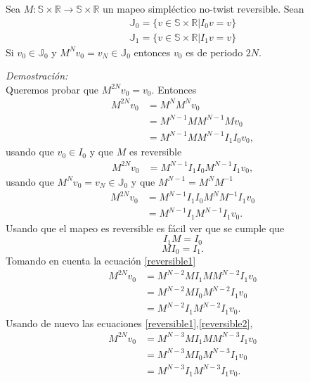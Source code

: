 \begin{thm}
Sea $M:\mathbb{S} \times \mathbb{R} \longrightarrow \mathbb{S}\times\mathbb{R}$ un mapeo simpl\'ectico no-twist reversible. Sean 
\begin{eqnarray}
\mathbb{J}_{0} = \{v \in \mathbb{S} \times \mathbb{R} | I_{0}v = v\}
\end{eqnarray}
\begin{eqnarray}
\mathbb{J}_{1} = \{v \in \mathbb{S} \times \mathbb{R} | I_{1}v = v\}
\end{eqnarray}
Si $v_{0}\in \mathbb{J}_{0}$ y $M^{N}v_{0}=v_{N}\in \mathbb{J}_{0}$ entonces $v_{0}$ es de periodo $2N$.
\end{thm}
\textit{Demostraci\'on:}\\
Queremos probar que $M^{2N}v_{0}=v_{0}$. Entonces
\begin{align*}
	M^{2N}v_{0} &= M^{N}M^{N}v_{0}\\
				&= M^{N-1}MM^{N-1}Mv_{0}\\
				&= M^{N-1}MM^{N-1}I_{1}I_{0}v_{0},
\end{align*}
usando que $v_{0}\in I_{0}$ y que $M$ es reversible
\begin{align*}
	M^{2N}v_{0} &= M^{N-1}I_{1}I_{0}M^{N-1}I_{1}v_{0},
\end{align*}
usando que $M^{N}v_{0}=v_{N}\in \mathbb{J}_{0}$ y que $M^{N-1}=M^{N}M^{-1}$
\begin{align*}
	M^{2N}v_{0} &= M^{N-1}I_{1}I_{0}M^{N}M^{-1}I_{1}v_{0}\\
				&= M^{N-1}I_{1}	M^{N-1}I_{1}v_{0}.
\end{align*}
Usando que el mapeo es reversible es f\'acil ver que se cumple que
\begin{equation}
I_{1}M=I_{0}
\label{reversible1}
\end{equation}
\begin{equation}
MI_{0} = I_{1}.
\label{reversible2}
\end{equation}
Tomando en cuenta la ecuaci\'on \ref{reversible1}
\begin{align*}
M^{2N}v_{0} &= M^{N-2}MI_{1}MM^{N-2}I_{1}v_{0} \\
			&= M^{N-2}MI_{0}M^{N-2}I_{1}v_{0}\\
			&= M^{N-2}I_{1}M^{N-2}I_{1}v_{0}.
\end{align*}
Usando de nuevo las ecuaciones \ref{reversible1},\ref{reversible2},
\begin{align*}
M^{2N}v_{0} &= M^{N-3}MI_{1}MM^{N-3}I_{1}v_{0} \\
			&= M^{N-3}MI_{0}M^{N-3}I_{1}v_{0}\\
			&= M^{N-3}I_{1}M^{N-3}I_{1}v_{0}.
\end{align*}
